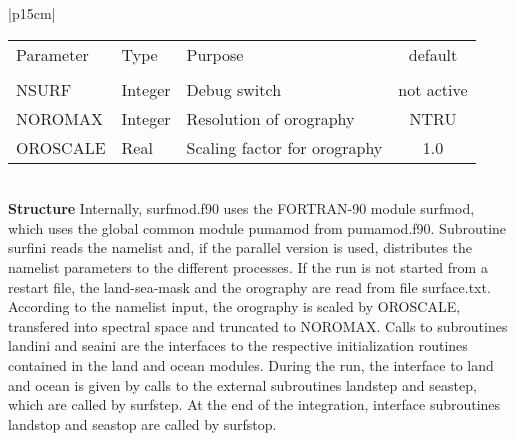 \begin{center}
\begin{tabular}{|p{15cm}|}
\begin{center}
\begin{tabular}{l l p{5cm} c} %
Parameter & Type & Purpose & default \\
&&&\\
NSURF & Integer & Debug switch  & not active \\
NOROMAX & Integer & Resolution of orography & NTRU \\
OROSCALE & Real & Scaling factor for orography & 1.0 \\
\end{tabular} 
\end{center}
\vspace{3mm} \\
\hline
\vspace{2mm} {\bf Structure} Internally, {\module surfmod.f90}
uses the FORTRAN-90 module {\modu surfmod}, which uses the global
common module {\modu pumamod} from {\module pumamod.f90}.
Subroutine {\sub surfini} reads the namelist and, if the parallel version
is used,  distributes the namelist parameters to the different processes.
If the run is not started from a restart file, the
land-sea-mask and the
orography are read from file {\file surface.txt}.
According to the namelist input, the orography
is scaled by OROSCALE, transfered into spectral space and truncated
to NOROMAX. Calls to subroutines {\sub landini} and {\sub seaini}
are the interfaces to the respective initialization
routines contained in the land and ocean modules.
During the run, the interface to land and ocean
is given by calls to the external subroutines {\sub landstep}
and {\sub seastep}, which are called by {\sub surfstep}.
At the end of the integration, interface subroutines
{\sub landstop} and {\sub
seastop} are called by {\sub surfstop}. \vspace{3mm} \\
\hline
\end{tabular}
\end{center} 
\newpage

